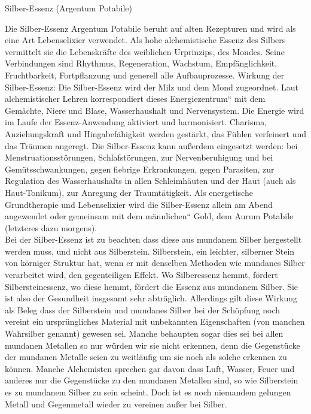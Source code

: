 \documentclass[a5paper,8pt]{book}
\begin{document}
\noindent Silber-Essenz (Argentum Potabile)\

Die Silber-Essenz Argentum Potabile beruht auf alten Rezepturen und wird als eine Art Lebenselixier verwendet. Als hohe alchemistische Essenz des Silbers vermittelt 
sie die Lebenskräfte des weiblichen Urprinzips, des Mondes. Seine Verbindungen sind Rhythmus, Regeneration, Wachstum, Empfänglichkeit, Fruchtbarkeit, Fortpflanzung 
und generell alle Aufbauprozesse. Wirkung der Silber-Essenz: Die Silber-Essenz wird der Milz und dem Mond zugeordnet. Laut alchemistischer Lehren korrespondiert dieses 
Energiezentrum“ mit dem Gemächte, Niere und Blase, Wasserhaushalt und Nervensystem. Die Energie wird im Laufe der Essenz-Anwendung aktiviert und harmonisiert. Charisma, 
Anziehungskraft und Hingabefähigkeit werden gestärkt, das Fühlen verfeinert und das Träumen angeregt. Die Silber-Essenz kann außerdem eingesetzt werden:
bei Menstruationsstörungen, Schlafstörungen, zur Nervenberuhigung und bei Gemütsschwankungen, gegen fiebrige Erkrankungen, gegen Parasiten, zur Regulation des 
Wasserhaushalts in allen Schleimhäuten und der Haut (auch als Haut-Tonikum), zur Anregung der Traumtätigkeit. Als energetische Grundtherapie und Lebenselixier 
wird die Silber-Essenz allein am Abend angewendet oder gemeinsam mit dem männlichen“ Gold, dem Aurum Potabile (letzteres dazu morgens).\\ 

Bei der Silber-Essenz ist zu beachten dass diese aus mundanem Silber hergestellt werden muss, und nicht aus Silberstein. Silberstein, ein leichter, silberner Stein 
von körniger Struktur hat, wenn er mit denselben Methoden wie mundanes Silber verarbeitet wird, den gegenteiligen Effekt. Wo Silberessenz hemmt, fördert Silbersteinessenz, 
wo diese hemmt, fördert die Essenz aus mundanem Silber. Sie ist also der Gesundheit insgesamt sehr abträglich. Allerdings gilt diese Wirkung als Beleg dass der Silberstein 
und mundanes Silber bei der Schöpfung noch vereint ein ursprüngliches Material mit unbekannten Eigenschaften (von manchen Wahrsilber genannt) gewesen sei.
Manche behaupten sogar dies sei bei allen mundanen Metallen so nur würden wir sie nicht erkennen, denn die Gegenstücke der mundanen Metalle seien zu weitläufig um sie 
noch als solche erkennen zu können. Manche Alchemisten sprechen gar davon dass Luft, Wasser, Feuer und anderes nur die Gegenstücke zu den mundanen Metallen sind, so wie 
Silberstein es zu mundanem Silber zu sein scheint. Doch ist es noch niemandem gelungen Metall und Gegenmetall wieder zu vereinen außer bei Silber.\\
 
\end{document}

